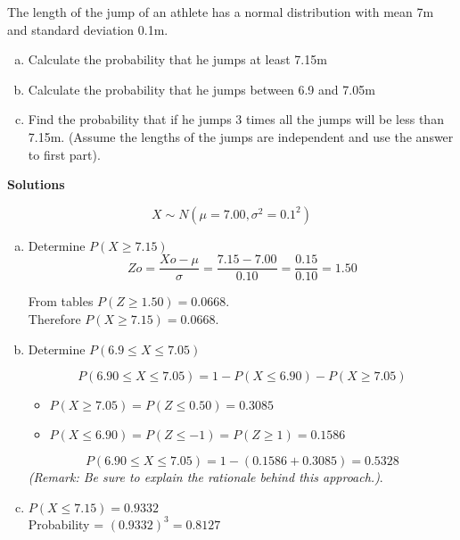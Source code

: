 \documentclass[a4paper,12pt]{article}
\begin{document}
\noindent The length of the jump of an athlete has a normal distribution with mean 7m and standard deviation 0.1m. 



\begin{enumerate}[(a)]
	\item 
	Calculate the probability that he jumps at least 7.15m
	
\item 
	Calculate the probability that he jumps between 6.9 and 7.05m
	
\item 
	Find the probability that if he jumps 3 times all the jumps will be less than 7.15m. (Assume the lengths of the jumps are independent and use the answer to first part).  
	
\end{enumerate}

\noindent \textbf{Solutions}

\[ X \sim N(\mu = 7.00,  \sigma^2 = 0.1^2 )\]


\begin{enumerate}[(a)]
    \item Determine $P(X \geq 7.15) $               
\[Zo=\frac{Xo-\mu}{\sigma} = \frac{7.15 - 7.00}{0.10}=\frac{0.15}{0.10}=1.50\]

From tables $P(Z\geq 1.50) = 0.0668$. \\        
Therefore $P(X\geq 7.15) = 0.0668$.

\item Determine $P(6.9\leq X \leq 7.05)$


\[P(6.90 \leq X \leq 7.05) = 1 - P(X\leq 6.90 ) - P(X \geq 7.05 )\]
\begin{itemize}
\item $P(X\geq 7.05 ) = P(Z \leq 0.50 ) = 0.3085 $  
\item $P(X\leq 6.90 ) = P(Z \leq -1 )= P(Z \geq 1 ) = 0.1586$
\end{itemize}
\[P(6.90 \leq X \leq 7.05) = 1 - (0.1586 + 0.3085) = 0.5328\]      
\noindent \textit{(Remark: Be sure to explain the rationale behind this approach.)}.
\item             
$P(X\leq 7.15) = 0.9332$\\         Probability = $(0.9332)^3= 0.8127$

\end{enumerate}
\end{document}
